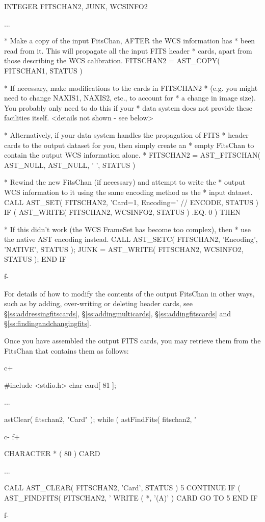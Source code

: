 \documentclass[twoside,11pt]{starlink}
\providecommand{\secref}[1]{\S\ref{#1}}
\begin{document}
\begin{terminalv}
      INTEGER FITSCHAN2, JUNK, WCSINFO2

      ...

*  Make a copy of the input FitsChan, AFTER the WCS information has
*  been read from it. This will propagate all the input FITS header
*  cards, apart from those describing the WCS calibration.
      FITSCHAN2 = AST_COPY( FITSCHAN1, STATUS )

*  If necessary, make modifications to the cards in FITSCHAN2
*  (e.g. you might need to change NAXIS1, NAXIS2, etc., to account for
*  a change in image size). You probably only need to do this if your
*  data system does not provide these facilities itself.
      <details not shown - see below>

*  Alternatively, if your data system handles the propagation of FITS
*  header cards to the output dataset for you, then simply create an
*  empty FitsChan to contain the output WCS information alone.
*     FITSCHAN2 = AST_FITSCHAN( AST_NULL, AST_NULL, ' ', STATUS )

*  Rewind the new FitsChan (if necessary) and attempt to write the
*  output WCS information to it using the same encoding method as the
*  input dataset.
      CALL AST_SET( FITSCHAN2, 'Card=1, Encoding=' // ENCODE, STATUS )
      IF ( AST_WRITE( FITSCHAN2, WCSINFO2, STATUS ) .EQ. 0 ) THEN

*  If this didn't work (the WCS FrameSet has become too complex), then
*  use the native AST encoding instead.
         CALL AST_SETC( FITSCHAN2, 'Encoding', 'NATIVE', STATUS );
         JUNK = AST_WRITE( FITSCHAN2, WCSINFO2, STATUS );
      END IF
\end{terminalv}
\normalsize
f-

For details of how to modify the contents of the output FitsChan in
other ways, such as by adding, over-writing or deleting header cards,
see \secref{ss:addressingfitscards}, \secref{ss:addingmulticards}, \secref{ss:addingfitscards} and
\secref{ss:findingandchangingfits}.

Once you have assembled the output FITS cards, you may retrieve them
from the FitsChan that contains them as follows:

c+
\small
\begin{terminalv}
#include <stdio.h>
char card[ 81 ];

...

astClear( fitschan2, "Card" );
while ( astFindFits( fitschan2, "%
\end{terminalv}
\normalsize
c-
f+
\small
\begin{terminalv}
      CHARACTER * ( 80 ) CARD

      ...

      CALL AST_CLEAR( FITSCHAN2, 'Card', STATUS )
 5    CONTINUE
      IF ( AST_FINDFITS( FITSCHAN2, '%
         WRITE ( *, '(A)' ) CARD
         GO TO 5
      END IF
\end{terminalv}
\normalsize
f-
\end{document}
